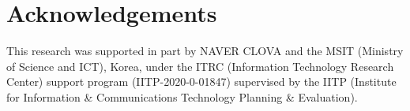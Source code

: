 \documentclass[10pt, conference, compsocconf]{IEEEtran}
\begin{document}






\section*{Acknowledgements}

This research was supported in part by NAVER CLOVA and the MSIT (Ministry of Science and ICT), Korea, under the ITRC (Information Technology Research Center) support program (IITP-2020-0-01847) supervised by the IITP (Institute for Information \& Communications Technology Planning \& Evaluation). 





%
%
%







\end{document}
